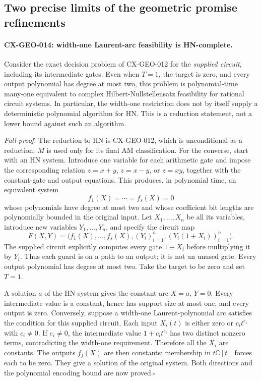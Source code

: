 \subsection{Two precise limits of the geometric promise refinements}

\paragraph{CX-GEO-014: width-one Laurent-arc feasibility is HN-complete.}
Consider the exact decision problem of CX-GEO-012 for the
\emph{supplied circuit}, including its intermediate gates. Even
when $T=1$, the target is zero, and every output polynomial has
degree at most two, this problem is polynomial-time many-one
equivalent to complex Hilbert-Nullstellensatz feasibility for
rational circuit systems. In particular, the width-one restriction
does not by itself supply a deterministic polynomial algorithm
for HN. This is a reduction statement, not a lower bound against
such an algorithm.

\emph{Full proof.}
The reduction to HN is CX-GEO-012, which is unconditional as a
reduction; $M$ is used only for its final AM classification. For
the converse, start with an HN system. Introduce one variable for
each arithmetic gate and impose the corresponding relation
$z=x+y$, $z=x-y$, or $z=xy$, together with the constant-gate
and output equations. This produces, in polynomial time, an
equivalent system
\[
                    f_1(X)=\cdots=f_s(X)=0
\]
whose polynomials have degree at most two and whose coefficient
bit lengths are polynomially bounded in the original input. Let
$X_1,\ldots,X_n$ be all its variables, introduce new variables
$Y_1,\ldots,Y_n$, and specify the circuit map
\[
 F(X,Y)=\bigl(f_1(X),\ldots,f_s(X),
            (Y_i)_{i=1}^n,(Y_i(1+X_i))_{i=1}^n\bigr).
 \tag{CX-width-one-guard}
\]
The supplied circuit explicitly computes every gate $1+X_i$
before multiplying it by $Y_i$. Thus each guard is on a path to
an output; it is not an unused gate. Every output polynomial has
degree at most two. Take the target to be zero and set $T=1$.

A solution $a$ of the HN system gives the constant arc
$X=a$, $Y=0$. Every intermediate value is a constant, hence
has support size at most one, and every output is zero. Conversely,
suppose a width-one Laurent-polynomial arc satisfies the condition
for this supplied circuit. Each input $X_i(t)$ is either zero or
$c_it^{e_i}$ with $c_i\ne0$. If $e_i\ne0$, the intermediate
value $1+c_it^{e_i}$ has two distinct nonzero terms, contradicting
the width-one requirement. Therefore all the $X_i$ are constants.
The outputs $f_j(X)$ are then constants; membership in
$t\mathbb C[t]$ forces each to be zero. They give a solution of
the original system. Both directions and the polynomial encoding
bound are now proved.\hfill$\square$

